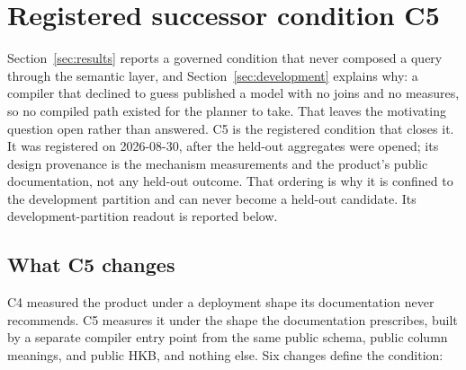 \section{Registered successor condition C5}
\label{sec:c5}

Section~\ref{sec:results} reports a governed condition that never composed a
query through the semantic layer, and Section~\ref{sec:development} explains why:
a compiler that declined to guess published a model with no joins and no
measures, so no compiled path existed for the planner to take. That leaves the
motivating question open rather than answered. C5 is the registered condition
that closes it. It was registered on 2026-08-30, after the held-out aggregates
were opened; its design provenance is the mechanism measurements and the
product's public documentation, not any held-out outcome. That ordering is why it
is confined to the development partition and can never become a held-out
candidate. Its development-partition readout is reported below.

\subsection{What C5 changes}
C4 measured the product under a deployment shape its documentation never
recommends. C5 measures it under the shape the documentation prescribes, built by
a separate compiler entry point from the same public schema, public column
meanings, and public HKB, and nothing else. Six changes define the condition:

